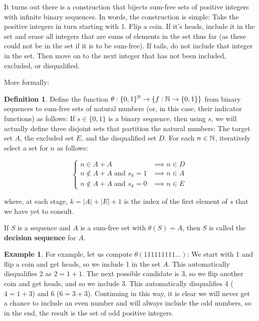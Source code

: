 \documentclass{article}
\theoremstyle{definition}
\newtheorem{definition}{Definition}
\newtheorem{example}{Example}
\theoremstyle{remark}
\numberwithin{equation}{section}
\begin{document}
It turns out there is a construction that bijects sum-free sets of
positive integers with infinite binary sequences.  In words, the
construction is simple: Take the positive integers in turn starting
with 1.  Flip a coin.  If it's heads, include it in the set and erase
all integers that are sums of elements in the set thus far (as these
could not be in the set if it is to be sum-free).  If tails, do not
include that integer in the set.  Then move on to the next integer
that has not been included, excluded, or disqualified.

More formally: 

\begin{definition}Define the function
  $\theta : \{0,1\}^{\mathbb{N}} \to \{f : \mathbb{N} \to \{0,1\}\}$ from binary
  sequences to sum-free sets of natural numbers (or, in this case,
  their indicator functions) as follows: If $s\in\{0,1\}$ is a binary
  sequence, then using $s$, we will actually define three disjoint
  sets that partition the natural numbers: The target set $A$, the
  excluded set $E$, and the disqualified set $D$.  For each
  $n \in \mathbb{N}$, iteratively select a set for $n$ as follows:

\[\begin{cases}
n \in A+A &\implies n \in D\\
n \notin A+A \text{ and } s_k = 1 &\implies n \in A\\
n \notin A+A \text{ and } s_k = 0 &\implies n \in E
\end{cases}\]

where, at each stage, $k = |A|+|E|+1$ is the index of the first
element of $s$ that we have yet to consult. 

If $S$ is a sequence and $A$ is a sum-free set with $\theta(S) = A$,
then $S$ is called the \textbf{decision sequence} for $A$.
\end{definition}

\begin{example}
  For example, let us compute $\theta(111111111...)$: We start with 1
  and flip a coin and get heads, so we include 1 in the set $A$.  This
  automatically disqualifies 2 as $2 = 1+1$.  The next possible
  candidate is 3, so we flip another coin and get heads, and so we
  include 3.  This automatically disqualifies 4 ($4 = 1+3$) and 6
  ($6 = 3+3$).  Continuing in this way, it is clear we will never get
  a chance to include an even number and will always include the odd
  numbers, so in the end, the result is the set of odd positive
  integers.
\end{example}
\end{document}
